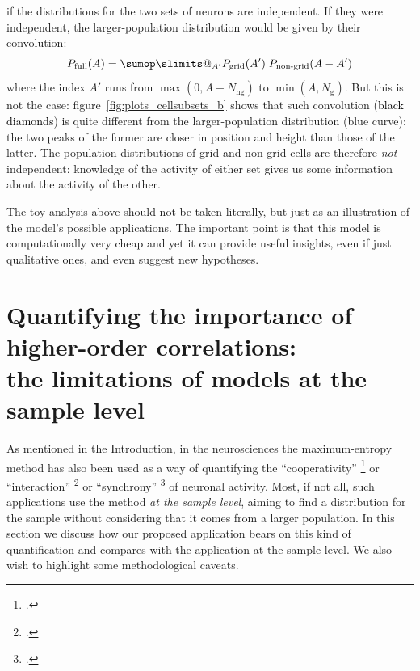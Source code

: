 \documentclass[\ifafour a4paper,12pt,\else a5paper,10pt,\fi%
onecolumn,oneside,article,%
british%
]{memoir}
\makeatletter
\theoremstyle{remark}
\theoremstyle{innote}
\def\sum{\DOTSI\sumop\slimits@}
\newcommand*{\citep}{\footcites}
\DeclarePairedDelimiter\set{\{}{\}}
\renewcommand*{\|}{\nonscript\,\vert\nonscript\;\mathopen{}}
\newcommand*{\eg}{{e.g.}}
\newcommand*{\yAv}{A}
\newcommand*{\yNg}{N_{\text{g}}}
\newcommand*{\yNng}{N_{\text{ng}}}
\newcommand*{\yA}{\yAv}%
\makeatother
\begin{document}
if the distributions for the two sets of neurons are independent. If they
were independent, the larger-population distribution would be given by
their convolution:
\begin{equation}
  \label{eq:convolution}
  P_{\text{full}}(\yA) = \sum_{\yA'} P_{\text{grid}}(\yA')\;
  P_{\text{non-grid}}(\yA-\yA') %
\end{equation}
where the index $\yA'$ runs from $\max(0,\yA-\yNng)$ to $\min(\yA,\yNg)$.
But this is not the case: 
figure~\ref{fig:plots_cellsubsets_b} shows that such convolution
(\textcolor{black}{black diamonds}) is quite different from the
larger-population distribution (\textcolor{myblue}{blue curve}): the two
peaks of the former are closer in position and height than those of the
latter. The population distributions of grid and non-grid cells are
therefore \emph{not} independent: knowledge of the activity of either set
gives us some information about the activity of the other.

\medskip

The toy analysis above should not be taken literally, but just as an
illustration of the model's possible applications. The important point is
that this model is computationally very cheap and yet it can provide
useful insights, even if just qualitative ones, and even suggest new
hypotheses.




\section{Quantifying the importance of higher-order correlations:\\
  the limitations of models at the sample level}
\label{sec:marginalization}

As mentioned in the Introduction, in the neurosciences the maximum-entropy
method has also been used as a way of quantifying the
\enquote{cooperativity} \citep[\eg][]{gersteinetal1985} or
\enquote{interaction}
\citep[\eg][]{martignonetal1995,schneidmanetal2006,shlensetal2006} or
\enquote{synchrony} \citep[\eg]{bohteetal2000,amarietal2003} of neuronal
activity. Most, if not all, such applications use the method \emph{at the
  sample level}, aiming to find a distribution for the sample without
considering that it comes from a larger population. In this section we
discuss how our proposed application bears on this kind of quantification
and compares with the application at the sample level. We also wish to
highlight some methodological caveats.%
\end{document}
